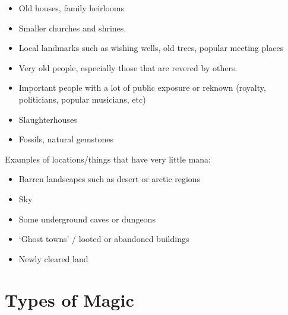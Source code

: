 \documentclass[twoside]{book}
\begin{document}
\begin{itemize}
      
  \item   Old houses, family heirlooms 
  \item   Smaller churches and shrines. 
  \item   Local landmarks such as wishing wells, old trees,
               popular meeting places 
  \item   Very old people, especially those that are revered
               by others. 
  \item   Important people with a lot of public exposure or
               reknown (royalty, politicians, popular musicians, etc)
               
  \item   Slaughterhouses 
  \item   Fossils, natural gemstones 
\end{itemize}
    Examples of locations/things that have very little
             mana: 
\begin{itemize}
      
  \item   Barren landscapes such as desert or arctic regions
               
  \item   Sky 
  \item   Some underground caves or dungeons 
  \item   `Ghost towns' / looted or abandoned
               buildings 
  \item   Newly cleared land 
\end{itemize}
  
    

\section{Types of Magic}
    
    
\end{document}
